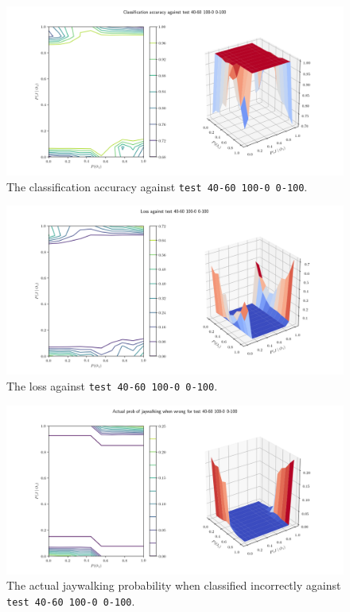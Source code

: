 \documentclass{report}
\newcommand{\code}{\texttt}
\begin{document}
\begin{figure}[h]
    \centering
    \centerline{\includegraphics[scale=0.55]{test_40-60_100-0_0-100_accuracy.png}}
    \caption[]{The classification accuracy against \code{test 40-60 100-0 0-100}.}
    \label{fig:test_40-60_100-0_0-100_accuracy_plot}
\end{figure}

\begin{figure}[h]
    \centering
    \centerline{\includegraphics[scale=0.55]{test_40-60_100-0_0-100_loss.png}}
    \caption[]{The loss against \code{test 40-60 100-0 0-100}.}
    \label{fig:test_40-60_100-0_0-100_loss_plot}
\end{figure}

\begin{figure}[h]
    \centering
    \centerline{\includegraphics[scale=0.55]{test_40-60_100-0_0-100_jay_prob.png}}
    \caption[]{The actual jaywalking probability when classified incorrectly against \code{test 40-60 100-0 0-100}.}
    \label{fig:test_40-60_100-0_0-100_jay_prob_plot}
\end{figure}
\end{document}
